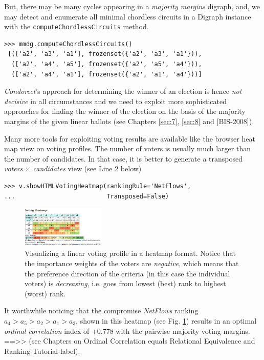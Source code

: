 But, there may be many cycles appearing in a \emph{majority margins} digraph, and, we may detect and enumerate all minimal chordless circuits in a Digraph instance with the \texttt{computeChordlessCircuits} method.

\begin{lstlisting}[basicstyle=\footnotesize]
>>> mmdg.computeChordlessCircuits()
 [(['a2', 'a3', 'a1'], frozenset({'a2', 'a3', 'a1'})), 
  (['a2', 'a4', 'a5'], frozenset({'a2', 'a5', 'a4'})), 
  (['a2', 'a4', 'a1'], frozenset({'a2', 'a1', 'a4'}))]
\end{lstlisting}

\emph{Condorcet}'s approach for determining the winner of an election is hence \emph{not decisive} in all circumstances and we need to exploit more sophisticated approaches for finding the winner of the election on the basis of the majority margins of the given linear ballots (see Chapters \ref{sec:7}, \ref{sec:8} and [BIS-2008]). 

Many more tools for exploiting voting results are available like the browser heat map view on voting profiles. The number of voters is usually much larger than the number of candidates. In that case, it is better to generate a transposed \emph{voters} $\times$ \emph{candidates} view (see Line 2 below) 

\begin{lstlisting}[basicstyle=\footnotesize]
>>> v.showHTMLVotingHeatmap(rankingRule='NetFlows',
...                         Transposed=False)
\end{lstlisting}

\begin{figure}[h]
\sidecaption
\includegraphics[width=4cm]{Figures/votingHeatmap.png}
\caption{Visualizing a linear voting profile in a heatmap format. Notice that the importance weights of the voters are \emph{negative}, which means that the preference direction of the criteria (in this case the individual voters) is \emph{decreasing}, i.e. goes from lowest (best) rank to highest (worst) rank.
}
\label{fig:7.3}       %
\end{figure}

It worthwhile noticing that the compromise \emph{NetFlows} ranking $a_4 > a_5 > a_2 > a_1 > a_3$, shown in this heatmap (see Fig. \ref{fig:7.3}) results in an optimal \emph{ordinal correlation} index of $+0.778$ with the pairwise majority voting margins.
==>> (see Chapters on Ordinal Correlation equals Relational Equivalence and Ranking-Tutorial-label). 

